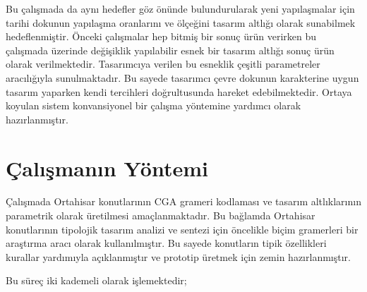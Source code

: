 \documentclass[12pt,turkish,a4paperpaper,]{report}
\begin{document}
Bu çalışmada da aynı hedefler göz önünde bulundurularak yeni
yapılaşmalar için tarihi dokunun yapılaşma oranlarını ve ölçeğini
tasarım altlığı olarak sunabilmek hedeflenmiştir. Önceki çalışmalar hep
bitmiş bir sonuç ürün verirken bu çalışmada üzerinde değişiklik
yapılabilir esnek bir tasarım altlığı sonuç ürün olarak verilmektedir.
Tasarımcıya verilen bu esneklik çeşitli parametreler aracılığıyla
sunulmaktadır. Bu sayede tasarımcı çevre dokunun karakterine uygun
tasarım yaparken kendi tercihleri doğrultusunda hareket edebilmektedir.
Ortaya koyulan sistem konvansiyonel bir çalışma yöntemine yardımcı
olarak hazırlanmıştır.

\hypertarget{uxe7alux131ux15fmanux131n-yuxf6ntemi}{%
\section{Çalışmanın
Yöntemi}\label{uxe7alux131ux15fmanux131n-yuxf6ntemi}}

Çalışmada Ortahisar konutlarının CGA grameri kodlaması ve tasarım
altlıklarının parametrik olarak üretilmesi amaçlanmaktadır. Bu bağlamda
Ortahisar konutlarının tipolojik tasarım analizi ve sentezi için
öncelikle biçim gramerleri bir araştırma aracı olarak kullanılmıştır. Bu
sayede konutların tipik özellikleri kurallar yardımıyla açıklanmıştır ve
prototip üretmek için zemin hazırlanmıştır.

Bu süreç iki kademeli olarak işlemektedir;
\end{document}
